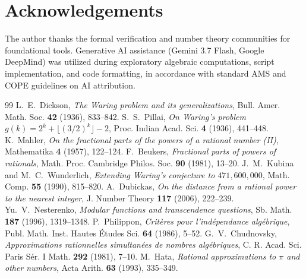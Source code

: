 \documentclass[11pt,reqno]{article}
\theoremstyle{plain}
\theoremstyle{definition}
\numberwithin{equation}{section}
\begin{document}
\section*{Acknowledgements}
The author thanks the formal verification and number theory communities for foundational tools. Generative AI assistance (Gemini 3.7 Flash, Google DeepMind) was utilized during exploratory algebraic computations, script implementation, and code formatting, in accordance with standard AMS and COPE guidelines on AI attribution.

\begin{thebibliography}{99}
 L.~E.~Dickson, \emph{The Waring problem and its generalizations}, Bull. Amer. Math. Soc. \textbf{42} (1936), 833--842.
 S.~S.~Pillai, \emph{On Waring's problem $g(k) = 2^k + \lfloor(3/2)^k\rfloor - 2$}, Proc. Indian Acad. Sci. \textbf{4} (1936), 441--448.
 K.~Mahler, \emph{On the fractional parts of the powers of a rational number (II)}, Mathematika \textbf{4} (1957), 122--124.
 F.~Beukers, \emph{Fractional parts of powers of rationals}, Math. Proc. Cambridge Philos. Soc. \textbf{90} (1981), 13--20.
 J.~M.~Kubina and M.~C.~Wunderlich, \emph{Extending Waring's conjecture to $471{,}600{,}000$}, Math. Comp. \textbf{55} (1990), 815--820.
 A.~Dubickas, \emph{On the distance from a rational power to the nearest integer}, J. Number Theory \textbf{117} (2006), 222--239.
 Yu.~V.~Nesterenko, \emph{Modular functions and transcendence questions}, Sb. Math. \textbf{187} (1996), 1319--1348.
 P.~Philippon, \emph{Crit\`eres pour l'ind\'ependance alg\'ebrique}, Publ. Math. Inst. Hautes \'Etudes Sci. \textbf{64} (1986), 5--52.
 G.~V.~Chudnovsky, \emph{Approximations rationnelles simultan\'ees de nombres alg\'ebriques}, C. R. Acad. Sci. Paris S\'er. I Math. \textbf{292} (1981), 7--10.
 M.~Hata, \emph{Rational approximations to $\pi$ and other numbers}, Acta Arith. \textbf{63} (1993), 335--349.
\end{thebibliography}
\end{document}
